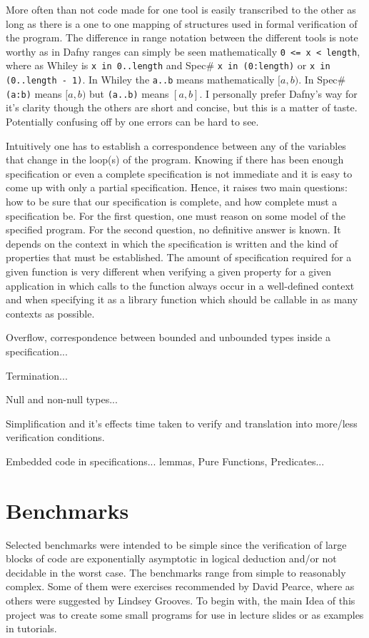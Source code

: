 \documentclass[10pt]{article} %
\begin{document}
More often than not code made for one tool is easily transcribed to the other as long as there is a one to one mapping of structures used in formal verification of the program. The difference in range notation between the different tools is note worthy as in Dafny ranges can simply be seen mathematically \verb/0 <= x < length/, where as Whiley is \verb/x in 0..length/ and Spec\# \verb/x in (0:length)/ or \verb/x in (0..length - 1)/. In Whiley the \verb/a..b/ means mathematically $[a,b)$. In Spec\# \verb/(a:b)/ means  $[a,b)$ but \verb/(a..b)/ means $[a,b]$. I personally prefer Dafny's way for it's clarity though the others are short and concise, but this is a matter of taste. Potentially confusing off by one errors can be hard to see.

Intuitively one has to establish a correspondence between any of the variables that change in the loop(s) of the program. Knowing if there has been enough specification or even a complete specification is not immediate and it is easy to come up with only a partial specification. Hence, it raises two main questions: how to be sure that our specification is complete, and how complete must a specification be. For the first question, one must reason on some model of the specified program. For the second question, no definitive answer is known. It depends on the context in which the specification is written and the kind of properties that must be established. The amount of specification required for a given function is very different when verifying a given property for a given application in which calls to the function always occur in a well-defined context and when specifying it as a library function which should be callable in as many contexts as possible.

Overflow, correspondence between bounded and unbounded types inside a specification...

Termination...

Null and non-null types...

Simplification and it's effects time taken to verify and translation into more/less verification conditions.

Embedded code in specifications... lemmas, Pure Functions, Predicates...

\section{Benchmarks}
Selected benchmarks were intended to be simple since the verification of large blocks of code are exponentially asymptotic in logical deduction and\slash or not decidable in the worst case. The benchmarks range from simple to reasonably complex. Some of them were exercises recommended by David Pearce, where as others were suggested by Lindsey Grooves. To begin with, the main Idea of this project was to create some small programs for use in lecture slides or as examples in tutorials. 
\end{document}
